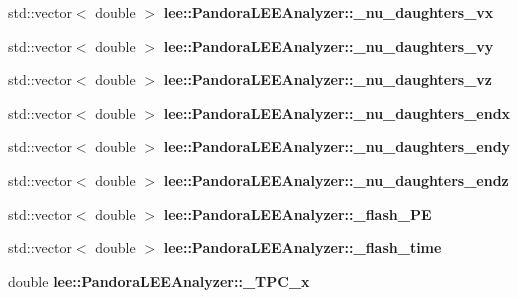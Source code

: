 \begin{DoxyCompactItemize}
\item 
\hypertarget{group__lee_ga35e3d0f602ee460d83440447698baef1}{std\-::vector$<$ double $>$ {\bfseries lee\-::\-Pandora\-L\-E\-E\-Analyzer\-::\-\_\-nu\-\_\-daughters\-\_\-vx}}\label{group__lee_ga35e3d0f602ee460d83440447698baef1}

\item 
\hypertarget{group__lee_gaa564f473e072ce7fc9702781805907bd}{std\-::vector$<$ double $>$ {\bfseries lee\-::\-Pandora\-L\-E\-E\-Analyzer\-::\-\_\-nu\-\_\-daughters\-\_\-vy}}\label{group__lee_gaa564f473e072ce7fc9702781805907bd}

\item 
\hypertarget{group__lee_gadda9ce5e644a8f78ef769f443990ab20}{std\-::vector$<$ double $>$ {\bfseries lee\-::\-Pandora\-L\-E\-E\-Analyzer\-::\-\_\-nu\-\_\-daughters\-\_\-vz}}\label{group__lee_gadda9ce5e644a8f78ef769f443990ab20}

\item 
\hypertarget{group__lee_ga2c05930087430260a4ba4f26beb8355b}{std\-::vector$<$ double $>$ {\bfseries lee\-::\-Pandora\-L\-E\-E\-Analyzer\-::\-\_\-nu\-\_\-daughters\-\_\-endx}}\label{group__lee_ga2c05930087430260a4ba4f26beb8355b}

\item 
\hypertarget{group__lee_gafdefa43fde43f949f6b6af3e908cb1e2}{std\-::vector$<$ double $>$ {\bfseries lee\-::\-Pandora\-L\-E\-E\-Analyzer\-::\-\_\-nu\-\_\-daughters\-\_\-endy}}\label{group__lee_gafdefa43fde43f949f6b6af3e908cb1e2}

\item 
\hypertarget{group__lee_ga0c2eb616df5aa07c601d0bc72399c636}{std\-::vector$<$ double $>$ {\bfseries lee\-::\-Pandora\-L\-E\-E\-Analyzer\-::\-\_\-nu\-\_\-daughters\-\_\-endz}}\label{group__lee_ga0c2eb616df5aa07c601d0bc72399c636}

\item 
\hypertarget{group__lee_ga9320e2f0e9a7e201a978a21a2eb74a39}{std\-::vector$<$ double $>$ {\bfseries lee\-::\-Pandora\-L\-E\-E\-Analyzer\-::\-\_\-flash\-\_\-\-P\-E}}\label{group__lee_ga9320e2f0e9a7e201a978a21a2eb74a39}

\item 
\hypertarget{group__lee_gaecdf711df932ed4823d2c9b222a3e8f4}{std\-::vector$<$ double $>$ {\bfseries lee\-::\-Pandora\-L\-E\-E\-Analyzer\-::\-\_\-flash\-\_\-time}}\label{group__lee_gaecdf711df932ed4823d2c9b222a3e8f4}

\item 
\hypertarget{group__lee_ga8c55bb8de6e184c1adbc191f3d6f12d5}{double {\bfseries lee\-::\-Pandora\-L\-E\-E\-Analyzer\-::\-\_\-\-T\-P\-C\-\_\-x}}\label{group__lee_ga8c55bb8de6e184c1adbc191f3d6f12d5}


\end{DoxyCompactItemize}
